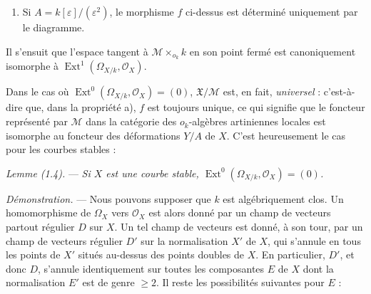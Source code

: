 \documentclass[10pt]{article}
\newcommand{\Ext}{\operatorname{Ext}}
\newcommand{\cO}{\mathcal O}
\newcommand{\cM}{\mathcal M}
\newcommand{\cX}{\mathfrak X}
\newcommand{\eps}{\varepsilon}
\begin{document}
\begin{enumerate}[label=\emph{\alph*)},resume]
\item Si $A=k[\eps]/(\eps^2)$, le morphisme $f$ ci-dessus est déterminé uniquement par le diagramme.
\end{enumerate}
Il s'ensuit que l'espace tangent à $\cM\times_{o_k}k$ en son point fermé est canoniquement isomorphe à $\Ext^1(\Omega_{X/k},\cO_X)$.

Dans le cas où $\Ext^0(\Omega_{X/k},\cO_X)=(0)$, $\cX/\cM$ est, en fait, \emph{universel} : c'est-à-dire que, dans la propriété a), $f$ est toujours unique, ce qui signifie que le foncteur représenté par $\cM$ dans la catégorie des $o_k$-algèbres artiniennes locales est isomorphe au foncteur des déformations $Y/A$ de $X$. C'est heureusement le cas pour les courbes stables :

\medskip
\noindent\emph{Lemme (1.4).} --- \emph{Si $X$ est une courbe stable, $\Ext^0(\Omega_{X/k},\cO_X)=(0)$.}

\noindent\emph{Démonstration.} --- Nous pouvons supposer que $k$ est algébriquement clos. Un homomorphisme de $\Omega_X$ vers $\cO_X$ est alors donné par un champ de vecteurs partout régulier $D$ sur $X$. Un tel champ de vecteurs est donné, à son tour, par un champ de vecteurs régulier $D'$ sur la normalisation $X'$ de $X$, qui s'annule en tous les points de $X'$ situés au-dessus des points doubles de $X$. En particulier, $D'$, et donc $D$, s'annule identiquement sur toutes les composantes $E$ de $X$ dont la normalisation $E'$ est de genre $\geq 2$. Il reste les possibilités suivantes pour $E$ :
\end{document}
